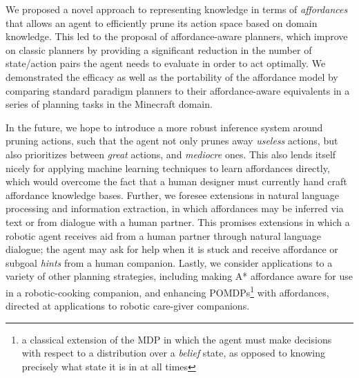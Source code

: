 \documentclass[]{article}
\begin{document}
We proposed a novel approach to representing knowledge in terms of
{\em affordances}~\citep{gibson77} that allows an agent to efficiently
prune its action space based on domain knowledge. This led to the 
proposal of affordance-aware planners, which improve on classic planners
by providing a significant reduction in the number of state/action pairs the
agent needs to evaluate in order to act optimally. We demonstrated the efficacy 
as well as the portability of the affordance model by comparing standard paradigm
planners to their affordance-aware equivalents in a series of planning tasks in the Minecraft
domain.

In the future, we hope to introduce a more robust inference system around pruning actions, such that
the agent not only prunes away {\it useless} actions, but also prioritizes between
{\it great} actions, and {\it mediocre} ones. This also lends itself nicely for applying
machine learning techniques to learn affordances directly, which would 
overcome the fact that a human designer must currently hand craft affordance knowledge bases.
Further, we foresee extensions in natural language processing and information
extraction, in which affordances may be inferred via text or from dialogue with a human partner.
This promises extensions in which a robotic agent receives aid from a human partner through natural language
dialogue; the agent may ask for help when it is stuck and
receive affordance or subgoal {\it hints} from a human companion. Lastly, we consider applications to a variety of other planning
strategies, including making A* affordance aware for use in a robotic-cooking companion, and enhancing POMDPs\footnote{a classical extension of the MDP in which the agent must make decisions with respect to a distribution over a {\it belief} state,
as opposed to knowing precisely what state it is in at all times} with affordances, directed at applications to robotic care-giver companions.


  
\end{document}
